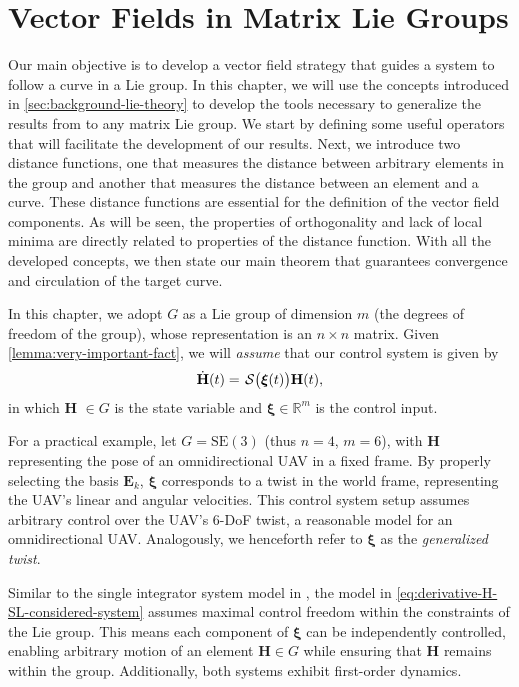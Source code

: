 \chapter{Vector Fields in Matrix Lie Groups}\label{ch:vector_field}
Our main objective is to develop a vector field strategy that guides a system to follow a curve in a Lie group. In this chapter, we will use the concepts introduced in \cref{sec:background-lie-theory} to develop the tools necessary to generalize the results from \citet{Rezende2022} to any matrix Lie group. We start by defining some useful operators that will facilitate the development of our results. Next, we introduce two distance functions, one that measures the distance between arbitrary elements in the group and another that measures the distance between an element and a curve. These distance functions are essential for the definition of the vector field components. As will be seen, the properties of orthogonality and lack of local minima are directly related to properties of the distance function. With all the developed concepts, we then state our main theorem that guarantees convergence and circulation of the target curve.

In this chapter, we adopt $G$ as a Lie group of dimension $m$ (the degrees of freedom of the group), whose representation is an $n\times n$ matrix. Given \cref{lemma:very-important-fact}, we will \emph{assume} that our control system is given by
\begin{align}
    \dot{\mathbf{H}}(t)=\SL\bigl(\boldsymbol{\xi}(t)\bigr)\mathbf{H}(t),
    \label{eq:derivative-H-SL-considered-system}
\end{align}
in which $\mathbf{H}$ $\in G$ is the state variable and $\boldsymbol{\xi} \in \mathbb{R}^m$ is the control input. 

For a practical example, let $G=\text{SE}(3)$ (thus $n=4$, $m=6$), with $\mathbf{H}$ representing the pose of an omnidirectional UAV in a fixed frame. By properly selecting the basis $\mathbf{E}_k$, $\boldsymbol{\xi}$ corresponds to a twist in the world frame, representing the UAV's linear and angular velocities. This control system setup assumes arbitrary control over the UAV's 6-DoF twist, a reasonable model for an omnidirectional UAV. Analogously, we henceforth refer to $\boldsymbol{\xi}$ as the \emph{generalized twist}. 

Similar to the single integrator system model in \citet{Rezende2022}, the model in \eqref{eq:derivative-H-SL-considered-system} assumes maximal control freedom within the constraints of the Lie group. This means each component of $\boldsymbol{\xi}$ can be independently controlled, enabling arbitrary motion of an element $\mathbf{H}\in G$ while ensuring that $\mathbf{H}$ remains within the group. Additionally, both systems exhibit first-order dynamics.

